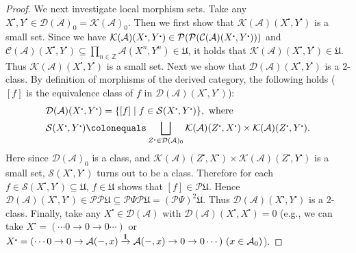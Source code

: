\documentclass{surv-l}
\numberwithin{equation}{chapter}
\numberwithin{figure}{chapter}
\theoremstyle{plain}
\theoremstyle{definition}
\theoremstyle{remark}
\newcommand{\id}{1\kern-.25em{\text{{\rm l}}}}
\DeclareMathOperator{\blank}{-}
\begin{document}
\begin{proof}
We next investigate local morphism sets.
Take any $X^{\centerdot}, Y^{\centerdot} \in {\mathcal{D}}(\mathcal{A})_0 = \mathcal{K}(\mathcal{A})_0$.
Then we first show that
$\mathcal{K}(\mathcal{A})(X^{\centerdot}, Y^{\centerdot})$ is a small set.
Since we have
$\mathcal{K}(\mathcal{A})(X^{\centerdot}, Y^{\centerdot}) \linebreak[3] \in \mathcal{P}(\mathcal{P}( {\mathcal{C}}(\mathcal{A})(X^{\centerdot}, Y^{\centerdot})))$
and
${\mathcal{C}}(\mathcal{A})(X^{\centerdot}, Y^{\centerdot}) \subseteq \prod_{n \in \mathbb{Z}} \mathcal{A}(X^n, Y^n) \in \mathfrak{U}$,
it holds that
$\mathcal{K}(\mathcal{A})(X^{\centerdot}, Y^{\centerdot}) \in \mathfrak{U}$.
Thus $\mathcal{K}(\mathcal{A})(X^{\centerdot}, Y^{\centerdot})$ is a small set.
Next we show that
${\mathcal{D}}(\mathcal{A})(X^{\centerdot}, Y^{\centerdot})$ is a $2$-class.
By definition of morphisms of the derived category,
the following holds
($[f]$ is the equivalence class of $f$ in ${\mathcal{D}}(\mathcal{A})(X^{\centerdot}, Y^{\centerdot})$):
\[
\begin{aligned}
&{\mathcal{D}}(\mathcal{A})(X^{\centerdot}, Y^{\centerdot}) = \{[f] \mid f \in \mathcal{S}(X^{\centerdot}, Y^{\centerdot})\}, \text{ where}\\
&\mathcal{S}(X^{\centerdot}, Y^{\centerdot})\colonequals  \bigsqcup_{Z^{\centerdot} \in {\mathcal{D}}(\mathcal{A})_0} \mathcal{K}(\mathcal{A})(Z^{\centerdot}, X^{\centerdot}) \times \mathcal{K}(\mathcal{A})(Z^{\centerdot}, Y^{\centerdot}).
\end{aligned}
\]
Here since ${\mathcal{D}}(\mathcal{A})_0$ is a class, and $\mathcal{K}(\mathcal{A})(Z^{\centerdot}, X^{\centerdot}) \times \mathcal{K}(\mathcal{A})(Z^{\centerdot}, Y^{\centerdot})$ is a small set, $\mathcal{S}(X^{\centerdot}, Y^{\centerdot})$ turns out to be a class.
Therefore for each $f \in \mathcal{S}(X^{\centerdot}, Y^{\centerdot}) \subseteq \mathfrak{U}$,
$f \in \mathfrak{U}$ shows that $[f] \in \mathcal{P}\mathfrak{U}$.
Hence ${\mathcal{D}}(\mathcal{A})(X^{\centerdot}, Y^{\centerdot}) \in \mathcal{P}\mathcal{P}\mathfrak{U} \subseteq \mathcal{P}\Psi\mathcal{P}\mathfrak{U} = (\mathcal{P}\Psi)^2\mathfrak{U}$.
Thus ${\mathcal{D}}(\mathcal{A})(X^{\centerdot}, Y^{\centerdot})$ is a $2$-class.
Finally, take any $X^{\centerdot} \in {\mathcal{D}}(\mathcal{A})$ with ${\mathcal{D}}(\mathcal{A})(X^{\centerdot}, X^{\centerdot}) = 0$
(e.g., we can take $X^{\centerdot} = (\cdots 0 \to 0 \to 0 \cdots)$ or
$X^{\centerdot} = (\cdots 0 \to 0 \to \mathcal{A}(\blank, x) \xrightarrow{\id} \mathcal{A}(\blank, x) \to 0 \to 0 \cdots) \ (x \in \mathcal{A}_0)$).

\end{proof}
\end{document}
